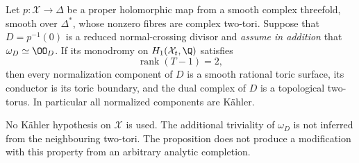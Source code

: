 \begin{proposition}
Let $p:\mathcal X\to\Delta$ be a proper holomorphic map
from a smooth complex threefold, smooth over $\Delta^*$,
whose nonzero fibres are complex two-tori. Suppose that
$D=p^{-1}(0)$ is a reduced normal-crossing divisor and
\emph{assume in addition} that $\omega_D\simeq\OO_D$.
If its monodromy on $H_1(\mathcal X_t,\Q)$ satisfies
\[
 \operatorname{rank}(T-1)=2,                         \tag{B.4.28.1}
\]
then every normalization component of $D$ is a smooth
rational toric surface, its conductor is its toric
boundary, and the dual complex of $D$ is a topological
two-torus. In particular all normalized components are
K\"ahler.

No K\"ahler hypothesis on $\mathcal X$ is used. The
additional triviality of $\omega_D$ is not inferred from
the neighbouring two-tori. The proposition does not
produce a modification with this property from an
arbitrary analytic completion.
\end{proposition}
